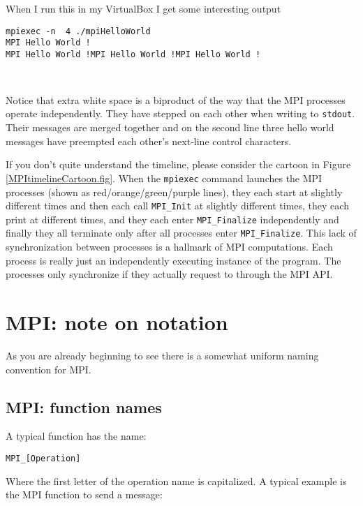 When I run this in my VirtualBox I get some interesting output 
\begin{Verbatim}[frame=single]
mpiexec -n  4 ./mpiHelloWorld
MPI Hello World !
MPI Hello World !MPI Hello World !MPI Hello World !



\end{Verbatim}

Notice that extra white space is a biproduct of the way that the MPI processes operate independently. They have stepped on each other when writing to \texttt{stdout}. Their messages are merged together and on the second line three hello world messages have preempted each other's next-line control characters.


If you don't quite understand the timeline, please consider the cartoon in Figure \ref{MPItimelineCartoon.fig}. When the \texttt{mpiexec} command launches the MPI processes (shown as red/orange/green/purple lines), they each start at slightly different times and then each call \texttt{MPI\_Init} at slightly different times, they each print at different times, and they each enter  \texttt{MPI\_Finalize} independently and finally they all terminate only after all processes enter  \texttt{MPI\_Finalize}. This lack of synchronization between processes is a hallmark of MPI computations. Each process is really just an independently executing instance of the program. The processes only synchronize if they actually request to through the MPI API.

\section{MPI: note on notation}

As you are already beginning to see there is a somewhat uniform naming convention for MPI. 

\subsection{MPI: function names}
A typical function has the name: 

\texttt{MPI\_[Operation]}

Where the first letter of the operation name is capitalized. A typical example is the MPI function to send a message:

